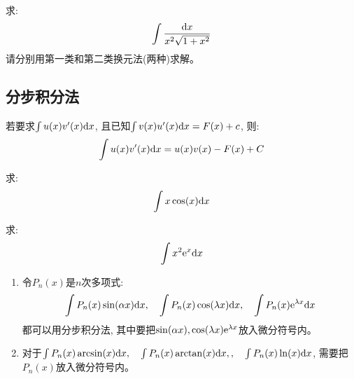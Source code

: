 \begin{example}
    求:
    \begin{equation*}
        \int \frac{\mathrm{d} x}{x^2\sqrt{1+x^2}}
    \end{equation*}
    请分别用第一类和第二类换元法(两种)求解。
\end{example}
\begin{solution}
    
\end{solution}

\subsection{分步积分法}
\begin{theorem}[分步积分法]
    若要求$\int u(x)v'(x)\mathrm{d} x$, 且已知$\int v(x)u'(x) \mathrm{d} x = F(x) + c$, 则:
    \begin{equation*}
        \int u(x)v'(x) \mathrm{d} x = u(x)v(x) - F(x) + C
    \end{equation*}
\end{theorem}

\begin{example}
    求:
    \begin{equation*}
        \int x \cos(x) \mathrm{d} x
    \end{equation*}
\end{example}
\begin{solution}
    
\end{solution}

\begin{example}
    求:
    \begin{equation*}
        \int x^2\mathrm{e}^x \mathrm{d} x
    \end{equation*}
\end{example}
\begin{solution}
    
\end{solution}
\begin{remark}
    \begin{enumerate}
        \item 令$P_n(x)$是$n$次多项式:
        \begin{equation*}
            \int P_n(x)\sin(\alpha x) \mathrm{d} x, \quad \int P_n(x)\cos(\lambda x) \mathrm{d} x, \quad \int P_n(x) \mathrm{e}^{\lambda x} \mathrm{d} x
        \end{equation*}
        都可以用分步积分法, 其中要把$\sin(\alpha x), \cos(\lambda x) \mathrm{e}^{\lambda x}$放入微分符号内。
        \item 对于$\int P_n(x) \arcsin(x) \mathrm{d} x, \quad \int P_n(x) \arctan(x) \mathrm{d} x,, \quad \int P_n(x)\ln(x) \mathrm{d} x$, 需要把$P_n(x)$放入微分符号内。
    \end{enumerate}
\end{remark}

